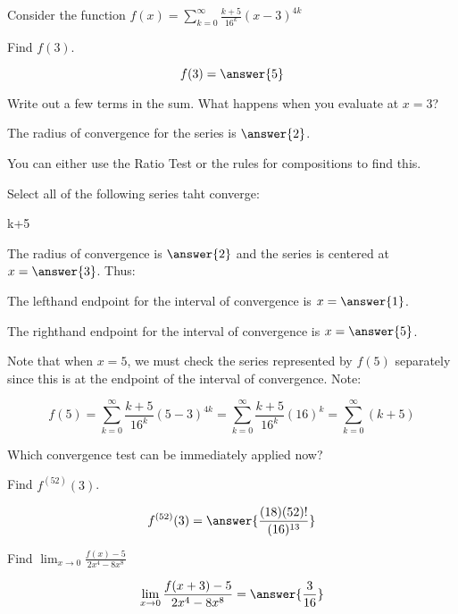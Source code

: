 \documentclass{ximera}
\author{Jim Talamo}
\begin{document}
\begin{exercise}
Consider the function $f(x) = \sum_{k=0}^{\infty} \frac{k+5}{16^k} (x-3)^{4k}$

\begin{exercise}
Find $f(3)$.

\[
f(3) = \answer{5}
\]
\begin{hint}
Write out a few terms in the sum.  What happens when you evaluate at $x=3$?
\end{hint}
\end{exercise}

\begin{exercise}
The radius of convergence for the series is $\answer{2}$.

\begin{hint}
You can either use the Ratio Test or the rules for compositions to find this.
\end{hint}

\end{exercise}
\begin{exercise}
Select all of the following series taht converge:

\begin{selectAll}
k+5
\end{selectAll}

\begin{hint}
The radius of convergence is $\answer{2}$ and the series is centered at $x=\answer{3}$.  Thus:

The lefthand endpoint for the interval of convergence is $x=\answer{1}$.

The righthand endpoint for the interval of convergence is $x=\answer{5}$.

Note that when $x=5$, we must check the series represented by $f(5)$ separately since this is at the endpoint of the interval of convergence.  Note:

\[
f(5) = \sum_{k=0}^{\infty}  \frac{k+5}{16^k} (5-3)^{4k} = \sum_{k=0}^{\infty}  \frac{k+5}{16^k} (16)^k = \sum_{k=0}^{\infty} (k+5)
\]

Which convergence test can be immediately applied now?
\end{hint}

\end{exercise}
\begin{exercise}
Find $f^{(52)}(3)$.

\[
f^{(52)}(3) = \answer{\frac{(18)(52)!}{(16)^{13}}}
\]
\end{exercise}
\begin{exercise}
Find $\lim_{x \to 0} \frac{f(x)-5}{2x^4-8x^8}$

\[
\lim_{x \to 0} \frac{f(x+3)-5}{2x^4-8x^8} = \answer{\frac{3}{16}}
\]
\end{exercise}


\end{exercise}
\end{document}
